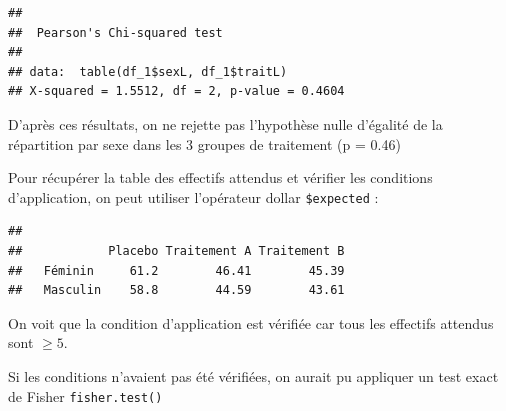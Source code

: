 \documentclass[
]{book}
\newenvironment{Shaded}{\begin{snugshade}}{\end{snugshade}}
\newcommand{\AttributeTok}[1]{\textcolor[rgb]{0.13,0.29,0.53}{#1}}
\newcommand{\CommentTok}[1]{\textcolor[rgb]{0.56,0.35,0.01}{\textit{#1}}}
\newcommand{\ConstantTok}[1]{\textcolor[rgb]{0.56,0.35,0.01}{#1}}
\newcommand{\DocumentationTok}[1]{\textcolor[rgb]{0.56,0.35,0.01}{\textbf{\textit{#1}}}}
\newcommand{\FunctionTok}[1]{\textcolor[rgb]{0.13,0.29,0.53}{\textbf{#1}}}
\newcommand{\NormalTok}[1]{#1}
\newcommand{\OtherTok}[1]{\textcolor[rgb]{0.56,0.35,0.01}{#1}}
\newcommand{\SpecialCharTok}[1]{\textcolor[rgb]{0.81,0.36,0.00}{\textbf{#1}}}
\begin{document}
\begin{Shaded}
\end{Shaded}

\begin{verbatim}
## 
##  Pearson's Chi-squared test
## 
## data:  table(df_1$sexL, df_1$traitL)
## X-squared = 1.5512, df = 2, p-value = 0.4604
\end{verbatim}

D'après ces résultats, on ne rejette pas l'hypothèse nulle d'égalité de la répartition par sexe dans les 3 groupes de traitement (p = 0.46)

Pour récupérer la table des effectifs attendus et vérifier les conditions d'application, on peut utiliser l'opérateur dollar \texttt{\$expected} :

\begin{Shaded}
\end{Shaded}

\begin{verbatim}
##           
##            Placebo Traitement A Traitement B
##   Féminin     61.2        46.41        45.39
##   Masculin    58.8        44.59        43.61
\end{verbatim}

On voit que la condition d'application est vérifiée car tous les effectifs attendus sont \(\geq 5\).

Si les conditions n'avaient pas été vérifiées, on aurait pu appliquer un test exact de Fisher \texttt{fisher.test()}

\begin{Shaded}
\end{Shaded}
\end{document}
